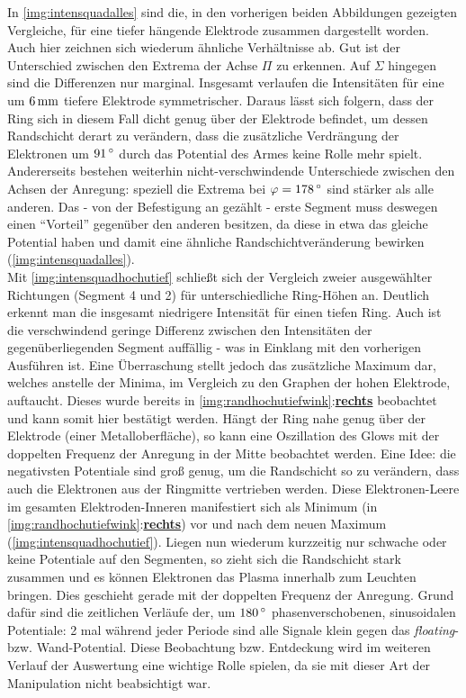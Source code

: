 \documentclass[numbers=noenddot,a4paper]{scrartcl}
\newcommand{\degree}{^\circ}
\newcommand{\tilt}[1]{\textit{#1}}
\newcommand{\fett}[1]{\textbf{#1}}
\begin{document}
					In \ref{img:intensquadalles} sind die, in den vorherigen beiden Abbildungen gezeigten Vergleiche, für eine tiefer hängende Elektrode zusammen dargestellt worden. Auch hier zeichnen sich wiederum ähnliche Verhältnisse ab. Gut ist der Unterschied zwischen den Extrema der Achse $\Pi$ zu erkennen. Auf $\Sigma$ hingegen sind die Differenzen nur marginal. Insgesamt verlaufen die Intensitäten für eine um $\unit[6]{mm}$ tiefere Elektrode symmetrischer. Daraus lässt sich folgern, dass der Ring sich in diesem Fall dicht genug über der Elektrode befindet, um dessen Randschicht derart zu verändern, dass die zusätzliche Verdrängung der Elektronen um $\unit[91]{\degree}$ durch das Potential des Armes keine Rolle mehr spielt. Andererseits bestehen weiterhin nicht-verschwindende Unterschiede zwischen den Achsen der Anregung: speziell die Extrema bei $\varphi=\unit[178]{\degree}$ sind stärker als alle anderen. Das - von der Befestigung an gezählt -  erste Segment muss deswegen einen "`Vorteil"' gegenüber den anderen besitzen, da diese in etwa das gleiche Potential haben und damit eine ähnliche Randschichtveränderung bewirken (\ref{img:intensquadalles}).\\
					Mit \ref{img:intensquadhochutief} schließt sich der Vergleich zweier ausgewählter Richtungen (Segment 4 und 2) für unterschiedliche Ring-Höhen an. Deutlich erkennt man die insgesamt niedrigere Intensität für einen tiefen Ring. Auch ist die verschwindend geringe Differenz zwischen den Intensitäten der gegenüberliegenden Segment auffällig - was in Einklang mit den vorherigen Ausführen ist. Eine Überraschung stellt jedoch das zusätzliche Maximum dar, welches anstelle der Minima, im Vergleich zu den Graphen der hohen Elektrode, auftaucht. Dieses wurde bereits in \ref{img:randhochutiefwink}:\underline{\fett{rechts}} beobachtet und kann somit hier bestätigt werden. Hängt der Ring nahe genug über der Elektrode (einer Metalloberfläche), so kann eine Oszillation des Glows mit der doppelten Frequenz der Anregung in der Mitte beobachtet werden. Eine Idee: die negativsten Potentiale sind groß genug, um die Randschicht so zu verändern, dass auch die Elektronen aus der Ringmitte vertrieben werden. Diese Elektronen-Leere im gesamten Elektroden-Inneren manifestiert sich als Minimum (in \ref{img:randhochutiefwink}:\underline{\fett{rechts}}) vor und nach dem neuen Maximum (\ref{img:intensquadhochutief}). Liegen nun wiederum kurzzeitig nur schwache oder keine Potentiale auf den Segmenten, so zieht sich die Randschicht stark zusammen und es können Elektronen das Plasma innerhalb zum Leuchten bringen. Dies geschieht gerade mit der doppelten Frequenz der Anregung. Grund dafür sind die zeitlichen Verläufe der, um $\unit[180]{\degree}$ phasenverschobenen, sinusoidalen Potentiale: 2 mal während jeder Periode sind alle Signale klein gegen das \tilt{floating}- bzw. Wand-Potential. Diese Beobachtung bzw. Entdeckung wird im weiteren Verlauf der Auswertung eine wichtige Rolle spielen, da sie mit dieser Art der Manipulation nicht beabsichtigt war.
\end{document}
